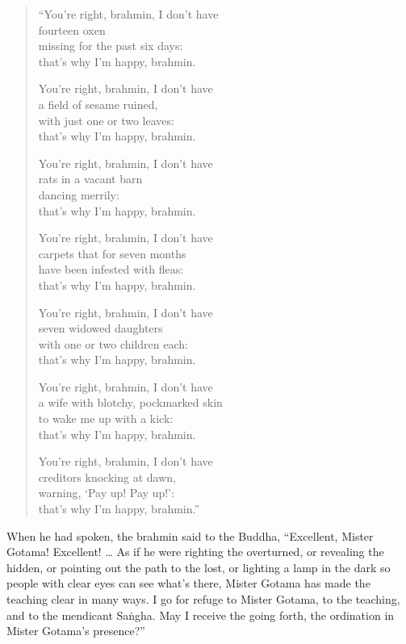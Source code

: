 \documentclass[12pt,openany]{book}%
\begin{document}
\begin{verse}
“You’re right, brahmin, I don’t have \\
fourteen oxen \\
missing for the past six days: \\
that’s why I’m happy, brahmin. 

You’re right, brahmin, I don’t have \\
a field of sesame ruined, \\
with just one or two leaves: \\
that’s why I’m happy, brahmin. 

You’re right, brahmin, I don’t have \\
rats in a vacant barn \\
dancing merrily: \\
that’s why I’m happy, brahmin. 

You’re right, brahmin, I don’t have \\
carpets that for seven months \\
have been infested with fleas: \\
that’s why I’m happy, brahmin. 

You’re right, brahmin, I don’t have \\
seven widowed daughters \\
with one or two children each: \\
that’s why I’m happy, brahmin. 

You’re right, brahmin, I don’t have \\
a wife with blotchy, pockmarked skin \\
to wake me up with a kick: \\
that’s why I’m happy, brahmin. 

You’re right, brahmin, I don’t have \\
creditors knocking at dawn, \\
warning, ‘Pay up! Pay up!’: \\
that’s why I’m happy, brahmin.” 

%
\end{verse}

When he had spoken, the brahmin said to the Buddha, “Excellent, Mister Gotama! Excellent! … As if he were righting the overturned, or revealing the hidden, or pointing out the path to the lost, or lighting a lamp in the dark so people with clear eyes can see what’s there, Mister Gotama has made the teaching clear in many ways. I go for refuge to Mister Gotama, to the teaching, and to the mendicant \textsanskrit{Saṅgha}. May I receive the going forth, the ordination in Mister Gotama’s presence?” 
\end{document}

